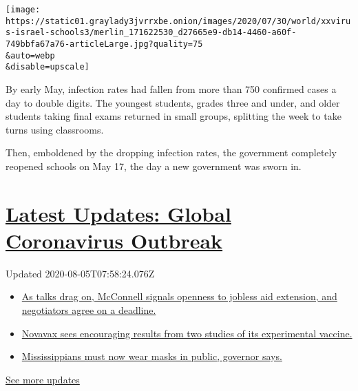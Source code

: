 \texttt{[image: https://static01.graylady3jvrrxbe.onion/images/2020/07/30/world/xxvirus-israel-schools3/merlin\_171622530\_d27665e9-db14-4460-a60f-749bbfa67a76-articleLarge.jpg?quality=75\\\&auto=webp\\\&disable=upscale]}

By early May, infection rates had fallen from more than 750 confirmed
cases a day to double digits. The youngest students, grades three and
under, and older students taking final exams returned in small groups,
splitting the week to take turns using classrooms.

Then, emboldened by the dropping infection rates, the government
completely reopened schools on May 17, the day a new government was
sworn in.

\hypertarget{latest-updates-global-coronavirus-outbreak}{%
\section{\texorpdfstring{\href{https://www.nytimes3xbfgragh.onion/2020/08/04/world/coronavirus-cases.html?action=click\&pgtype=Article\&state=default\&region=MAIN_CONTENT_1\&context=storylines_live_updates}{Latest
Updates: Global Coronavirus
Outbreak}}{Latest Updates: Global Coronavirus Outbreak}}\label{latest-updates-global-coronavirus-outbreak}}

Updated 2020-08-05T07:58:24.076Z

\begin{itemize}
\tightlist
\item
  \href{https://www.nytimes3xbfgragh.onion/2020/08/04/world/coronavirus-cases.html?action=click\&pgtype=Article\&state=default\&region=MAIN_CONTENT_1\&context=storylines_live_updates\#link-762df92}{As
  talks drag on, McConnell signals openness to jobless aid extension,
  and negotiators agree on a deadline.}
\item
  \href{https://www.nytimes3xbfgragh.onion/2020/08/04/world/coronavirus-cases.html?action=click\&pgtype=Article\&state=default\&region=MAIN_CONTENT_1\&context=storylines_live_updates\#link-1228a480}{Novavax
  sees encouraging results from two studies of its experimental
  vaccine.}
\item
  \href{https://www.nytimes3xbfgragh.onion/2020/08/04/world/coronavirus-cases.html?action=click\&pgtype=Article\&state=default\&region=MAIN_CONTENT_1\&context=storylines_live_updates\#link-794484ed}{Mississippians
  must now wear masks in public, governor says.}
\end{itemize}

\href{https://www.nytimes3xbfgragh.onion/2020/08/04/world/coronavirus-cases.html?action=click\&pgtype=Article\&state=default\&region=MAIN_CONTENT_1\&context=storylines_live_updates}{See
more updates}

